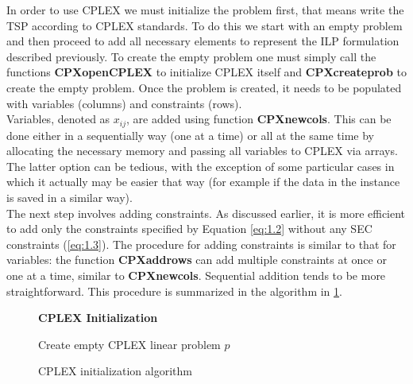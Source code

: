 In order to use CPLEX we must initialize the problem first, that means write the TSP according to CPLEX standards.
To do this we start with an empty problem and then proceed to add all necessary elements to represent the ILP formulation described previously.
To create the empty problem one must simply call the functions \textbf{CPXopenCPLEX} to initialize CPLEX itself and \textbf{CPXcreateprob} to create the empty problem.
Once the problem is created, it needs to be populated with variables (columns) and constraints (rows).\\
Variables, denoted as $x_{ij}$, are added using function \textbf{CPXnewcols}.
This can be done either in a sequentially way (one at a time) or all at the same time by allocating the necessary memory and passing all variables to CPLEX via arrays.
The latter option can be tedious, with the exception of some particular cases in which it actually may be easier that way (for example if the data in the instance is saved in a similar way).\\
The next step involves adding constraints. As discussed earlier, it is more efficient to add only the constraints specified by Equation \eqref{eq:1.2} without any SEC constraints (\eqref{eq:1.3}).
The procedure for adding constraints is similar to that for variables: the function \textbf{CPXaddrows} can add multiple constraints at once or one at a time, similar to \textbf{CPXnewcols}.
Sequential addition tends to be more straightforward.
This procedure is summarized in the algorithm in \figurename{ \ref{fig:CPLEXinit}}.

\begin{figure}[htbp]
	\textbf{CPLEX Initialization} \\
	\begin{algorithm}[H]
		\vspace{2mm}
		Create empty CPLEX linear problem $p$\\
	\end{algorithm}
	\caption{CPLEX initialization algorithm}\label{fig:CPLEXinit}
\end{figure}

